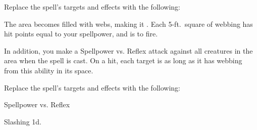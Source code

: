 


Replace the spell's targets and effects with the following:
\begin{spellcontent}

\begin{augmenttargetinginfo}




\end{augmenttargetinginfo}


\begin{augmenteffects}



\spelleffect
The area becomes filled with webs, making it .
Each 5-ft.\ square of webbing has hit points equal to your spellpower, and is  to fire.

In addition, you make a Spellpower vs. Reflex attack against all creatures in the area when the spell is cast.
On a hit, each target is \immobilized as long as it has webbing from this ability in its space.








\end{augmenteffects}

\end{spellcontent}








Replace the spell's targets and effects with the following:
\begin{spellcontent}

\begin{augmenttargetinginfo}




\end{augmenttargetinginfo}


\begin{augmenteffects}




\begin{spellattack}{Spellpower vs. Reflex}


\hit Slashing  \minus1d.


\end{spellattack}





\end{augmenteffects}

\end{spellcontent}





